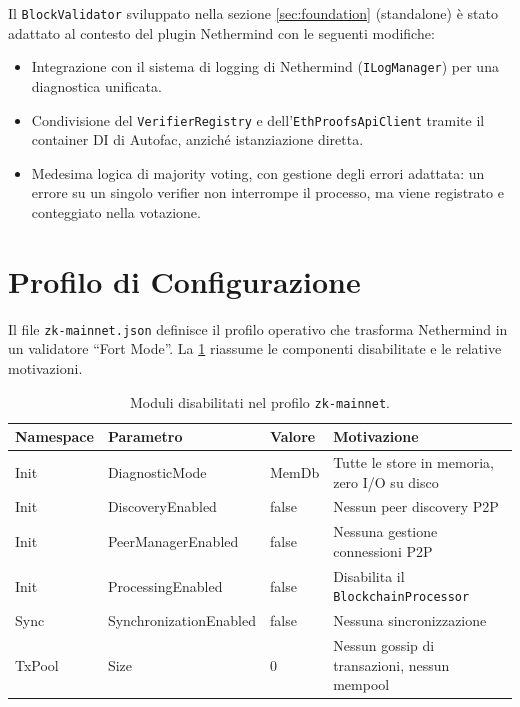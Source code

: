 \documentclass[12pt,a4paper,openright,twoside]{report}
\begin{document}
Il \texttt{BlockValidator} sviluppato nella sezione \ref{sec:foundation} (standalone) è stato adattato al contesto del plugin Nethermind con le seguenti modifiche:

\begin{itemize}
    \item Integrazione con il sistema di logging di Nethermind (\texttt{ILogManager}) per una diagnostica unificata.
    \item Condivisione del \texttt{VerifierRegistry} e dell'\texttt{EthProofsApiClient} tramite il container DI di Autofac, anziché istanziazione diretta.
    \item Medesima logica di majority voting, con gestione degli errori adattata: un errore su un singolo verifier non interrompe il processo, ma viene registrato e conteggiato nella votazione.
\end{itemize}

\section{Profilo di Configurazione}\label{sec:config}

Il file \texttt{zk-mainnet.json} definisce il profilo operativo che trasforma Nethermind in un validatore ``Fort Mode''. La \ref{tab:config_disabled} riassume le componenti disabilitate e le relative motivazioni.
\\
\begin{table}[H]
\centering
\begin{tabular}{l l l p{5cm}}
\hline
\textbf{Namespace} & \textbf{Parametro} & \textbf{Valore} & \textbf{Motivazione} \\
\hline
Init & DiagnosticMode & MemDb & Tutte le store in memoria, zero I/O su disco \\
Init & DiscoveryEnabled & false & Nessun peer discovery P2P \\
Init & PeerManagerEnabled & false & Nessuna gestione connessioni P2P \\
Init & ProcessingEnabled & false & Disabilita il \texttt{BlockchainProcessor} \\
Sync & SynchronizationEnabled & false & Nessuna sincronizzazione \\
TxPool & Size & 0 & Nessun gossip di transazioni, nessun mempool \\
\hline
\end{tabular}
\caption{Moduli disabilitati nel profilo \texttt{zk-mainnet}.}
\label{tab:config_disabled}
\end{table}
\end{document}
